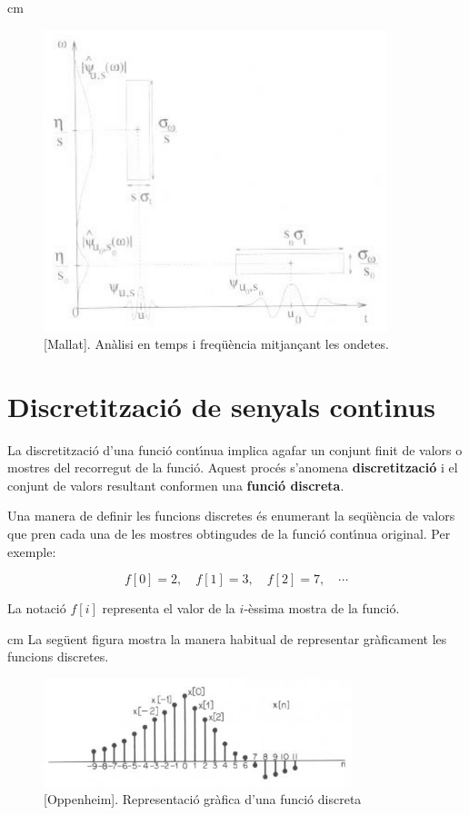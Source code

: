\documentclass{article}
\begin{document}
 cm

\begin{figure}[htbp]
\begin{center}
\includegraphics[width=10cm]{imatges/tempsfrequencia.eps}
\caption{[Mallat]. An\`alisi en temps i freq\"u\`encia mitjan\c{c}ant 
les ondetes.}
\end{center}
\end{figure}

\newpage
\section{Discretitzaci\'o de senyals continus}
La discretitzaci\'o d'una funci\'o cont\'\i nua implica agafar 
un conjunt finit de valors o mostres del recorregut de la funci\'o.
Aquest proc\'es s'anomena {\bf discretitzaci\'o} i el conjunt de 
valors resultant conformen una {\bf funci\'o discreta}.

Una manera de definir les funcions discretes \'es enumerant la seq\"u\`encia
de valors que pren cada una de les mostres obtingudes de la funci\'o 
cont\'\i nua original. Per exemple:

\[
f[0]=2, \quad f[1]=3, \quad f[2]=7, \quad \cdots
\]

\noindent
La notaci\'o $f[i]$ representa el valor de la $i$-\`essima mostra de la 
funci\'o.

 cm
La seg\"uent figura mostra la manera habitual de representar gr\`aficament
les funcions discretes.

\begin{figure}[htbp]
\begin{center}
\includegraphics[width=9cm]{imatges/senyaldiscret.eps}
\caption{[Oppenheim]. Representaci\'o gr\`afica d'una funci\'o discreta}
\end{center}
\end{figure}
\end{document}
